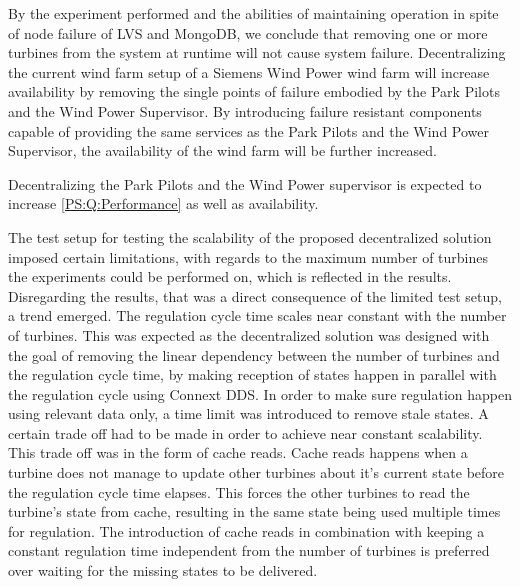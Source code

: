By the experiment performed and the abilities of maintaining operation in spite of node failure of LVS and MongoDB, we conclude that removing one or more turbines from the system at runtime will not cause system failure. Decentralizing the current wind farm setup of a Siemens Wind Power wind farm will increase availability by removing the single points of failure embodied by the Park Pilots and the Wind Power Supervisor. By introducing failure resistant components capable of providing the same services as the Park Pilots and the Wind Power Supervisor, the availability of the wind farm will be further increased.

Decentralizing the Park Pilots and the Wind Power supervisor is expected to increase \ref{PS:Q:Performance} as well as availability.

The test setup for testing the scalability of the proposed decentralized solution imposed certain limitations, with regards to the maximum number of turbines the experiments could be performed on, which is reflected in the results. Disregarding the results, that was a direct consequence of the limited test setup, a trend emerged. The regulation cycle time scales near constant with the number of turbines. This was expected as the decentralized solution was designed with the goal of removing the linear dependency between the number of turbines and the regulation cycle time, by making reception of states happen in parallel with the regulation cycle using Connext DDS. In order to make sure regulation happen using relevant data only, a time limit was introduced to remove stale states. A certain trade off had to be made in order to achieve near constant scalability. This trade off was in the form of cache reads.
Cache reads happens when a turbine does not manage to update other turbines about it's current state before the regulation cycle time elapses. This forces the other turbines to read the turbine's state from cache, resulting in the same state being used multiple times for regulation. The introduction of cache reads in combination with keeping a constant regulation time independent from the number of turbines is preferred over waiting for the missing states to be delivered.

